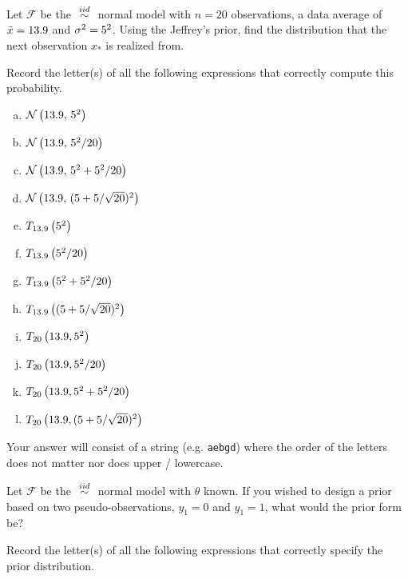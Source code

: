 \documentclass[12pt]{article}
\newcommand{\instr}{Your answer will consist of a string (e.g. \texttt{aebgd}) where the order of the letters does not matter nor does upper / lowercase.}
\begin{document}

\problem [8min] Let $\mathcal{F}$ be the $\iid$ normal model with $n = 20$ observations, a data average of $\bar{x} = 13.9$ and $\sigma^2 = 5^2$. Using the Jeffrey's prior, find the distribution that the next observation $x_*$ is realized from.

\benum
{} Record the letter(s) of all the following expressions that correctly compute this probability.

\begin{enumerate}[(a)]
\item $\mathcal{N}\left(13.9,\,5^2\right)$
\item $\mathcal{N}\left(13.9,\,5^2 / 20\right)$
\item $\mathcal{N}\left(13.9,\,5^2 + 5^2 / 20\right)$
\item $\mathcal{N}\left(13.9,\,(5 + 5 / \sqrt{20})^2\right)$
\item $T_{13.9}\left(5^2\right)$
\item $T_{13.9}\left(5^2 / 20\right)$
\item $T_{13.9}\left(5^2 + 5^2 / 20\right)$
\item $T_{13.9}\left((5 + 5 / \sqrt{20})^2\right)$
\item $T_{20}\left(13.9, 5^2\right)$
\item $T_{20}\left(13.9, 5^2 / 20\right)$
\item $T_{20}\left(13.9, 5^2 + 5^2 / 20\right)$
\item $T_{20}\left(13.9, (5 + 5 / \sqrt{20})^2\right)$
\end{enumerate}
\eenum\instr\pagebreak







\problem [8min] Let $\mathcal{F}$ be the $\iid$ normal model with $\theta$ known. If you wished to design a prior based on two pseudo-observations, $y_1 = 0$ and $y_1 = 1$, what would the prior form be?

\benum

 Record the letter(s) of all the following expressions that correctly specify the prior distribution.
\end{document}
